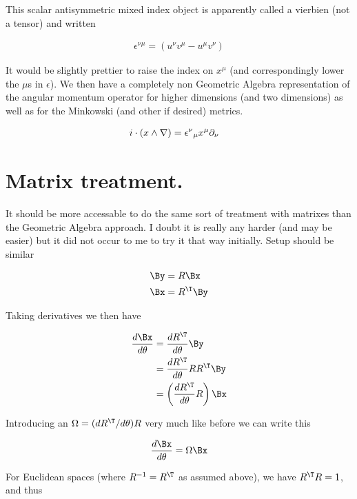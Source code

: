 This scalar antisymmetric mixed index object is apparently called a vierbien (not a tensor) and written 

\begin{align}\label{eqn:rotationGen:foo43}
\epsilon^{\nu\mu} = (u^\nu v^\mu - u^\mu v^\nu) 
\end{align}

It would be slightly prettier to raise the index on $x^\mu$ (and correspondingly lower the $\mu$s in $\epsilon$).  We then have a completely non Geometric Algebra representation of the angular momentum operator for higher dimensions (and two dimensions) as well as for the Minkowski (and other if desired) metrics.

\begin{align}\label{eqn:rotationGen:foo44}
i \cdot (x \wedge \nabla) 
&=
{\epsilon^{\nu}}_\mu x^\mu \partial_\nu 
\end{align}

\section{Matrix treatment.}

It should be more accessable to do the same sort of treatment with matrixes than the Geometric Algebra approach.  I doubt it is really any harder (and may be easier) but it did not occur to me to try it that way initially.  Setup should be similar

\begin{align}\label{eqn:rotationGen:boo1}
\By &= R \Bx \\
\Bx &= R^\T \By 
\end{align}

Taking derivatives we then have

\begin{align*}
\frac{d \Bx}{d\theta}
&= \frac{d R^\T}{d\theta} \By \\
&= \frac{d R^\T}{d\theta} R R^\T \By \\
&= \left( \frac{d R^\T}{d\theta} R \right) \Bx \\
\end{align*}

Introducing an $\Omega = (dR^\T/d\theta) R$ very much like before we can write this

\begin{align}\label{eqn:rotationGen:boo2}
\frac{d \Bx}{d\theta} = \Omega \Bx
\end{align}

For Euclidean spaces (where $R^{-1} = R^\T$ as assumed above), we have $R^\T R = 1$, and thus

